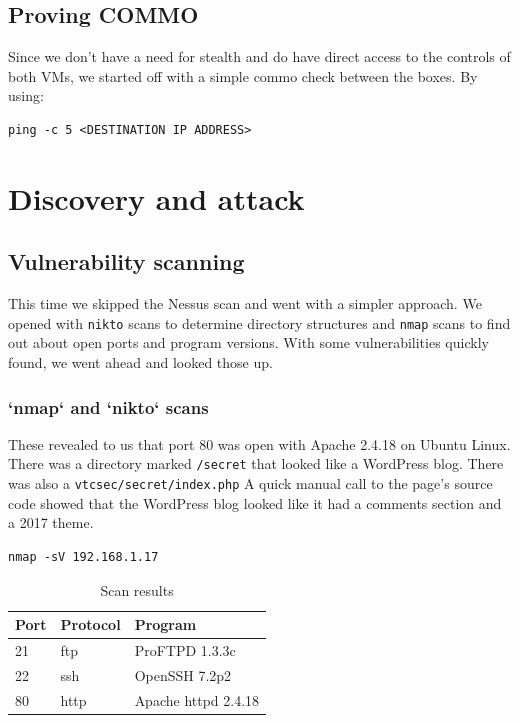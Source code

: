 \subsection{Proving COMMO}
Since we don't have a need for stealth and do have direct access to the controls of both VMs, we started off with a simple commo check between the boxes.  By using:

\begin{lstlisting}
ping -c 5 <DESTINATION IP ADDRESS>
\end{lstlisting}


\section{Discovery and attack}

\subsection{Vulnerability scanning}
This time we skipped the Nessus scan and went with a simpler approach.  We opened with \texttt{nikto} scans to determine directory structures and \texttt{nmap} scans to find out about open ports and program versions.  With some vulnerabilities quickly found, we went ahead and looked those up.

\subsubsection{`nmap` and `nikto` scans}
These revealed to us that port 80 was open with Apache 2.4.18 on Ubuntu Linux.  There was a directory marked \texttt{/secret} that looked like a WordPress blog.  There was also a \texttt{vtcsec/secret/index.php}  A quick manual call to the page's source code showed that the WordPress blog looked like it had a comments section and a 2017 theme.

\begin{lstlisting}
nmap -sV 192.168.1.17
\end{lstlisting}

\begin{table}[H]
\caption{Scan results}
\centering
\begin{tabular}{|l|l|l|}
\hline
Port & Protocol & Program \\
\hline
21 & ftp & ProFTPD 1.3.3c \\
22 & ssh & OpenSSH 7.2p2 \\
80 & http & Apache httpd 2.4.18 \\
\hline
\end{tabular}
\end{table}

